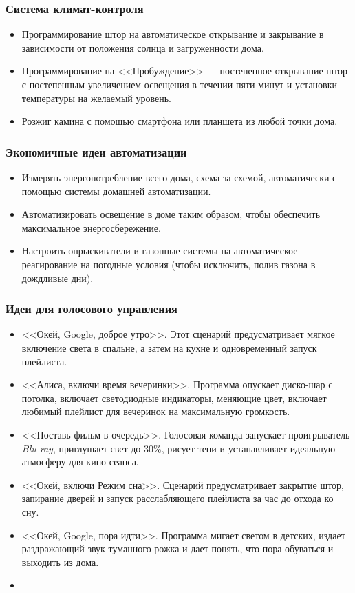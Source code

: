 \documentclass[a4paper,14pt]{extarticle}
\begin{document}
\subsubsection*{Система климат-контроля}
\begin{itemize}
	\item Программирование штор на автоматическое открывание и закрывание в зависимости от положения солнца и загруженности дома.
	\item Программирование на <<Пробуждение>> --- постепенное открывание штор с постепенным увеличением освещения в течении пяти минут и установки температуры на желаемый уровень.
	\item Розжиг камина с помощью смартфона или планшета из любой точки дома.
\end{itemize}

\subsubsection*{Экономичные идеи автоматизации}
\begin{itemize}
	\item Измерять энергопотребление всего дома, схема за схемой, автоматически с помощью системы домашней автоматизации.
	\item Автоматизировать освещение в доме таким образом, чтобы обеспечить максимальное энергосбережение.
	\item Настроить опрыскиватели и газонные системы на автоматическое реагирование на погодные условия (чтобы исключить, полив газона в дождливые дни).
\end{itemize}
\subsubsection*{Идеи для голосового управления}
\begin{itemize}
	\item  <<Окей, Google, доброе утро>>. Этот сценарий предусматривает мягкое включение света в спальне, а затем на кухне и одновременный запуск плейлиста.
	\item <<Алиса, включи время вечеринки>>. Программа опускает диско-шар с потолка, включает светодиодные индикаторы, меняющие цвет, включает любимый плейлист для вечеринок на максимальную громкость.
	\item <<Поставь фильм в очередь>>. Голосовая команда запускает проигрыватель \textit{Blu-ray}, приглушает свет до 30\%, рисует тени и устанавливает идеальную атмосферу для кино-сеанса.
	\item  <<Окей, включи Режим сна>>. Сценарий предусматривает закрытие штор, запирание дверей и запуск расслабляющего плейлиста за час до отхода ко сну.
	\item  <<Окей, Google, пора идти>>. Программа мигает светом в детских, издает раздражающий звук туманного рожка и дает понять, что пора обуваться и выходить из дома.
	\item 
\end{itemize}
\end{document}
